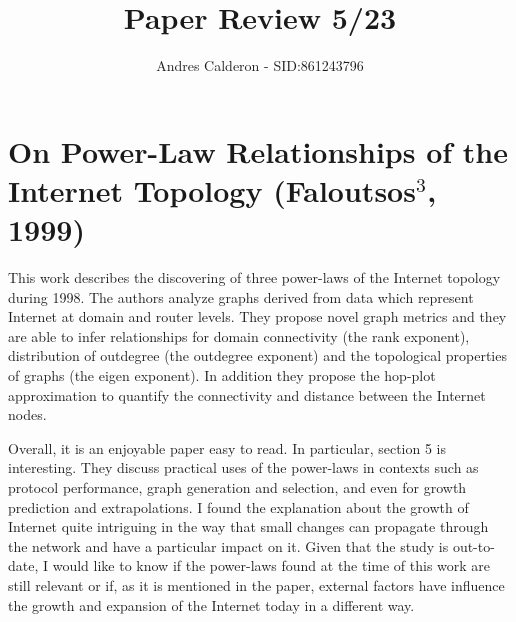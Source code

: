 \documentclass[a4paper,10pt]{scrartcl}
\title{Paper Review 5/23}
\author{Andres Calderon - SID:861243796}
\begin{document}
\maketitle
\thispagestyle{empty}

\section*{On Power-Law Relationships of the Internet Topology (Faloutsos$^3$, 1999)}
This work describes the discovering of three power-laws of the Internet topology during 1998.  The authors analyze graphs derived from data which represent Internet at domain and router levels.  They propose novel graph metrics and they are able to infer relationships for domain connectivity (the rank exponent), distribution of outdegree (the outdegree exponent) and the topological properties of graphs (the eigen exponent).  In addition they propose the hop-plot approximation to quantify the connectivity and distance between the Internet nodes.

Overall, it is an enjoyable paper easy to read.  In particular, section 5 is interesting.  They discuss practical uses of the power-laws in contexts such as protocol performance, graph generation and selection, and even for growth prediction and extrapolations.  I found the explanation about the growth of Internet quite intriguing in the way that small changes can propagate through the network and have a particular impact on it.  Given that the study is out-to-date,  I would like to know if the power-laws found at the time of this work are still relevant or if, as it is mentioned in the paper, external factors have influence the growth and expansion of the Internet today in a different way.  
\end{document}
